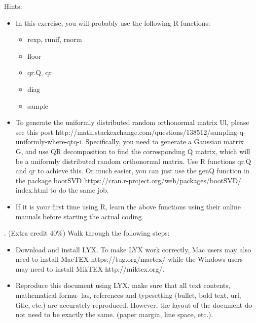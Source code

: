 \documentclass{article}
\begin{document}
Hints:
\begin{itemize} 

\item In this exercise, you will
probably use the following R functions:

\begin{itemize} 
\item rexp, runif, rnorm
\item floor
\item qr.Q, qr
\item diag
\item sample
\end{itemize} 
 
\item To generate the uniformly distributed random orthonormal matrix Ul, please see
this post
http://math.stackexchange.com/questions/138512/sampling-q-uniformly-where-qtq-i.
Specifically, you need to generate a Gaussian matrix G, and use QR decomposition
to find the corresponding Q matrix, which will be a uniformly distributed random
orthonormal matrix. Use R functions qr.Q and qr to achieve this. Or much easier,
you can just use the genQ function in the package bootSVD
https://cran.r-project.org/web/packages/bootSVD/ index.html to do the same
job.
\item If it is your first time using R, learn the above functions using their
online manuals before starting the actual coding.
\end{itemize} 



. (Extra credit 40\%) Walk
through the following steps:

\begin{itemize}
\item Download and install LYX. To make LYX work
correctly, Mac users may also need to install MacTEX https://tug.org/mactex/
while the Windows users may need to install MikTEX http://miktex.org/.

\item Reproduce this document using LYX, make sure that all text contents,
mathematical formu- las, references and typesetting (bullet, bold text, url,
title, etc.) are accurately reproduced. However, the layout of the document do
not need to be exactly the same. (paper margin, line space, etc.).
\end{itemize}

 
 
\end{document}

